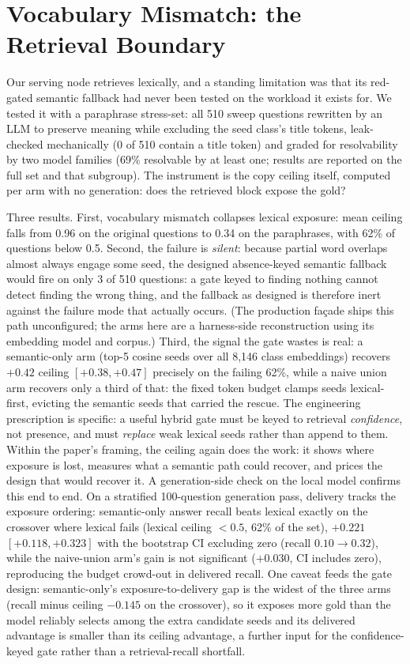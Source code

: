 \documentclass[10pt,twocolumn]{article}
\begin{document}
\section{Vocabulary Mismatch: the Retrieval Boundary}\label{sec:paraphrase}
Our serving node retrieves lexically, and a standing limitation was that its red-gated semantic
fallback had never been tested on the workload it exists for. We tested it with a paraphrase
stress-set: all 510 sweep questions rewritten by an LLM to preserve meaning while excluding the
seed class's title tokens, leak-checked mechanically (0 of 510 contain a title token) and graded
for resolvability by two model families (69\% resolvable by at least one; results are reported
on the full set and that subgroup). The instrument is the copy ceiling itself, computed per arm
with no generation: does the retrieved block expose the gold?

Three results. First, vocabulary mismatch collapses lexical exposure: mean ceiling falls from
0.96 on the original questions to 0.34 on the paraphrases, with 62\% of questions below 0.5.
Second, the failure is \emph{silent}: because partial word overlaps almost always engage some
seed, the designed absence-keyed semantic fallback would fire on only 3 of 510 questions:
a gate keyed to finding nothing cannot detect finding the wrong thing, and the fallback as
designed is therefore inert against the failure mode that actually occurs. (The production
fa\c{c}ade ships this path unconfigured; the arms here are a harness-side reconstruction using
its embedding model and corpus.) Third, the signal the gate wastes is real: a semantic-only arm
(top-5 cosine seeds over all 8{,}146 class embeddings) recovers $+0.42$ ceiling
$[+0.38,+0.47]$ precisely on the failing 62\%, while a naive union arm recovers only a third of
that: the fixed token budget clamps seeds lexical-first, evicting the semantic seeds that
carried the rescue. The engineering prescription is specific: a useful hybrid gate must be keyed
to retrieval \emph{confidence}, not presence, and must \emph{replace} weak lexical seeds rather
than append to them. Within the paper's framing, the ceiling again does the work: it shows where exposure is lost,
measures what a semantic path could recover, and prices the design that would recover it. A generation-side check on the local
model confirms this end to end. On a stratified 100-question generation pass, delivery tracks the
exposure ordering: semantic-only answer recall beats lexical exactly on the crossover where lexical
fails (lexical ceiling $<0.5$, 62\% of the set), $+0.221$ $[+0.118,+0.323]$ with the bootstrap CI
excluding zero (recall $0.10\to0.32$), while the naive-union arm's gain is not significant
($+0.030$, CI includes zero), reproducing the budget crowd-out in delivered recall. One caveat
feeds the gate design: semantic-only's exposure-to-delivery gap is the widest of the three arms
(recall minus ceiling $-0.145$ on the crossover), so it exposes more gold than the model reliably
selects among the extra candidate seeds and its delivered advantage is smaller than its ceiling
advantage, a further input for the confidence-keyed gate rather than a retrieval-recall shortfall.
\end{document}
